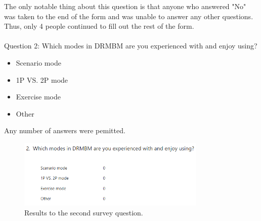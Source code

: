 \documentclass{report}
\begin{document}
The only notable thing about this question is that anyone who answered "No" was taken to the end of the form and was unable to answer any other questions. Thus, only 4 people continued to fill out the rest of the form.
\\\\
Question 2: Which modes in DRMBM are you experienced with and enjoy using?
\begin{itemize}
    \renewcommand\labelitemi{--}
    \item Scenario mode
    \item 1P VS. 2P mode
    \item Exercise mode
    \item Other
\end{itemize}
Any number of answers were pemitted.

\begin{figure}[ht]
    \centering
    \includegraphics[width=0.8\textwidth]{survey2.png}
    \caption{\label{fig:survey2}Results to the second survey question.}
\end{figure}
\end{document}
